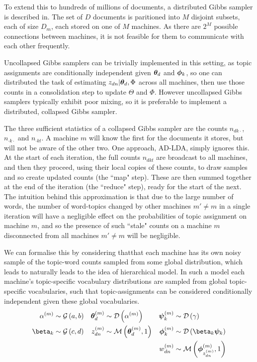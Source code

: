 To extend this to hundreds of millions of documents, a distributed Gibbs sampler is described in\cite{Newman2009}. The set of $D$ documents is paritioned into $M$ disjoint subsets, each of size $D_m$, each stored on one of $M$ machines. As there are $2^M$ possible connections between machines, it is not feasible for them to communicate with each other frequently.

Uncollapsed Gibbs samplers can be trivially implemented in this setting, as topic assignments are conditionally independent given ${ \bm \theta_d }$ and ${ \bm \phi_k }$, so one can distributed the task of estimating $z_{dn} | { \bm \theta_d }, \Phi$ across all machines, then use those counts in a consolidation step to update $\Theta$ and $\Phi$. However uncollapsed Gibbs samplers typically exhibit poor mixing, so it is preferable to implement a distributed, collapsed Gibbs sampler. 

The three sufficient statistics of a collapsed Gibbs sampler are the counts $n_{dk\cdot}$, $n_{\cdot k \cdot}$ and $n_{\cdot k t}$. A machine $m$ will know the first for the documents it stores, but will not be aware of the other two. One approach, AD-LDA, simply ignores this. At the start of each iteration, the full counts $n_{dkt}$ are broadcast to all machines, and then they proceed, using their local copies of these counts, to draw samples and so create updated counts (the ``map" step). These are then summed together at the end of the iteration (the ``reduce" step), ready for the start of the next. The intuition behind this approximation is that due to the large number of words, the number of word-topics changed by other machines $m' \neq m$ in a single iteration will have a negligible effect on the probabilities of topic assignment on machine $m$, and so the presence of such ``stale" counts on a machine $m$ disconnected from all machines $m' \neq m$ will be negligible.

We can formalise this by considering thatthat each machine has its own noisy sample of the topic-word counts sampled from some global distribution, which leads to naturally leads to the idea of hierarchical model. In such a model each machine's topic-specific vocabulary distributions are sampled from global topic-specific vocabularies, such that topic-assignments can be considered conditionally independent given these global vocabularies.
\begin{align}
\alpha^{(m)} & \sim \gam{a}{b} &
\vv{\theta}_d^{(m)} & \sim \dir{\alpha^{(m)}} &
\vv{\psi}_k^{(m)} & \sim \dir{\gamma} \\
\beta_k & \sim \gam{c}{d} &
z_{dn}^{(m)} & \sim \muln{\vv{\theta}_d^{(m)}}{1} &
\vv{\phi}_k^{(m)} & \sim \dir{\beta_k \vv{\psi}_k} \\
& &
& &
w_{dn}^{(m)} & \sim \muln{\vv{\phi}_{z_{dn}^{(m)}}^{(m)}}{1}
\end{align}

